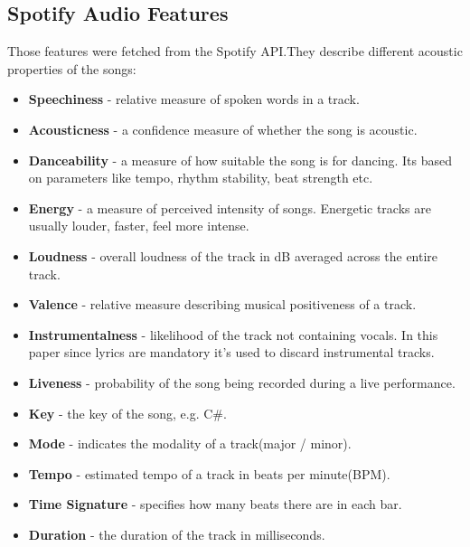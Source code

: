 \subsection{Spotify Audio Features}
\label{sec:spotifyaudiofeatures}
Those features were fetched from the Spotify API.They describe different
acoustic properties of the songs:
\begin{itemize}
  \item \textbf{Speechiness} - relative measure of spoken words in a track.
  \item \textbf{Acousticness} - a confidence measure of whether the song is
    acoustic.
  \item \textbf{Danceability} - a measure of how suitable the song is for
    dancing. Its based on parameters like tempo, rhythm stability, beat
    strength etc.
  \item \textbf{Energy} - a measure of perceived intensity of songs. Energetic
    tracks are usually louder, faster, feel more intense.
  \item \textbf{Loudness} - overall loudness of the  track in dB averaged
    across the entire track.
  \item \textbf{Valence} - relative measure describing musical positiveness of
    a track.
  \item \textbf{Instrumentalness} - likelihood of the track not containing
    vocals. In this paper since lyrics are mandatory it's used to discard
    instrumental tracks.
  \item \textbf{Liveness} - probability of the song being recorded during a
    live performance.
  \item \textbf{Key} - the key of the song, e.g. C\#.
  \item \textbf{Mode} - indicates the modality of a track(major / minor).
  \item \textbf{Tempo} - estimated tempo of a track in beats per minute(BPM).
  \item \textbf{Time Signature} - specifies how many beats there are in each
    bar.
  \item \textbf{Duration} - the duration of the track in milliseconds.
\end{itemize}


